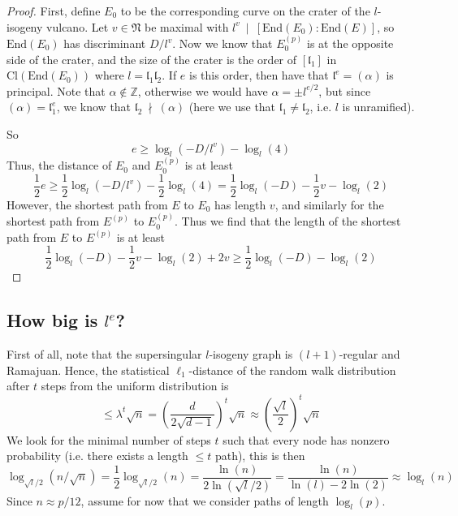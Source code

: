 \documentclass{scrartcl}
\newcommand{\N}{\mathbb{N}}
\newcommand{\Z}{\mathbb{Z}}
\newcommand{\End}{\mathrm{End}}
\newcommand{\divides}{\ \mid \ }
\newcommand{\notdivides}{\ \nmid \ }
\newcommand{\Cl}{\mathrm{Cl}}
\renewcommand{\l}{\mathfrak{l}}
\renewcommand{\N}{\mathfrak{N}}
\theoremstyle{definition}
\begin{document}
\begin{proof}
    First, define $E_0$ to be the corresponding curve on the crater of the $l$-isogeny vulcano.
    Let $v \in \N$ be maximal with $l^v \divides [\End(E_0) : \End(E)]$, so $\End(E_0)$ has discriminant $D/l^v$.
    Now we know that $E_0^{(p)}$ is at the opposite side of the crater, and the size of the crater is the order of $[\l_1]$ in $\Cl(\End(E_0))$ where $l = \l_1\l_2$.
    If $e$ is this order, then have that $\l^e = (\alpha)$ is principal.
    Note that $\alpha \notin \Z$, otherwise we would have $\alpha = \pm l^{e/2}$, but since $(\alpha) = \l_1^e$, we know that $\l_2 \notdivides (\alpha)$ (here we use that $\l_1 \neq \l_2$, i.e. $l$ is unramified).

    So
    \begin{equation*}
        e \geq \log_l(-D/l^v) - \log_l(4)
    \end{equation*}
    Thus, the distance of $E_0$ and $E_0^{(p)}$ is at least
    \begin{equation*}
        \frac 1 2 e \geq \frac 1 2 \log_l(-D/l^v) - \frac 1 2 \log_l(4) = \frac 1 2 \log_l(-D) - \frac 1 2 v - \log_l(2)
    \end{equation*}
    However, the shortest path from $E$ to $E_0$ has length $v$, and similarly for the shortest path from $E^{(p)}$ to $E_0^{(p)}$.
    Thus we find that the length of the shortest path from $E$ to $E^{(p)}$ is at least
    \begin{equation*}
        \frac 1 2 \log_l(-D) - \frac 1 2 v - \log_l(2) + 2v \geq \frac 1 2 \log_l(-D) - \log_l(2)
    \end{equation*}
\end{proof}

\subsection*{How big is $l^e$?}
First of all, note that the supersingular $l$-isogeny graph is $(l + 1)$-regular and Ramajuan.
Hence, the statistical $\ell_1$-distance of the random walk distribution after $t$ steps from the uniform distribution is
\begin{equation*}
    \leq \lambda^t \sqrt{n} = \left( \frac {d} {2\sqrt{d - 1}} \right)^t \sqrt{n} \approx \left( \frac {\sqrt{l}} 2 \right)^t \sqrt{n}
\end{equation*}
We look for the minimal number of steps $t$ such that every node has nonzero probability (i.e. there exists a length $\leq t$ path), this is then
\begin{equation*}
    \log_{\sqrt{l}/2} (n/\sqrt{n}) = \frac 1 2 \log_{\sqrt{l}/2}(n) = \frac {\ln(n)} {2\ln(\sqrt{l}/2)} = \frac {\ln(n)} {\ln(l) - 2\ln(2)} \approx \log_l(n)
\end{equation*}
Since $n \approx p/12$, assume for now that we consider paths of length $\log_l(p)$.
\end{document}
